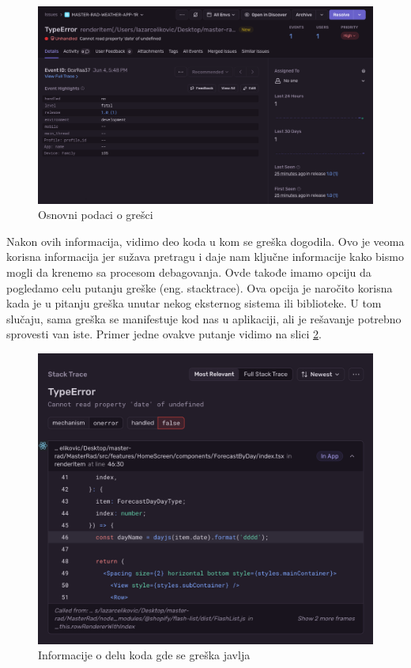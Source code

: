 \documentclass[12pt,oneside]{memoir}
\begin{document}
\begin{figure}[h!]
\centering
\includegraphics[scale=0.4]{docs/images/chapterSeven/sentryErrorBasicData.png}
\caption{Osnovni podaci o grešci}
\label{fig:sentryErrorBasicInfo}
\end{figure}

Nakon ovih informacija, vidimo deo koda u kom se greška dogodila. Ovo je veoma korisna informacija jer sužava pretragu i daje nam ključne informacije kako bismo mogli da krenemo sa procesom debagovanja. Ovde takođe imamo opciju da pogledamo celu putanju greške (eng. stacktrace). Ova opcija je naročito korisna kada je u pitanju greška unutar nekog eksternog sistema ili biblioteke. U tom slučaju, sama greška se manifestuje kod nas u aplikaciji, ali je rešavanje potrebno sprovesti van iste. Primer jedne ovakve putanje vidimo na slici \ref{fig:sentryStacktrace}.

\begin{figure}[h!]
\centering
\includegraphics[scale=0.4]{docs/images/chapterSeven/SentyErrorStacktrace.png}
\caption{Informacije o delu koda gde se greška javlja}
\label{fig:sentryStacktrace}
\end{figure}
\end{document}
